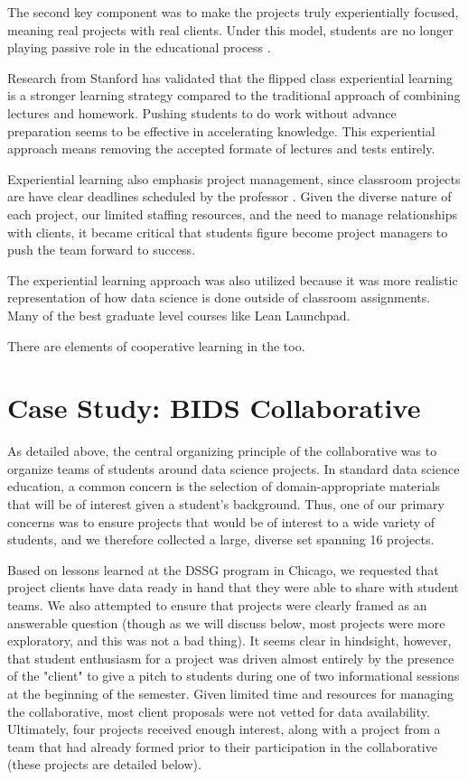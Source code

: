 \documentclass{sig-alternate}
\begin{document}
The second key component was to make the projects truly experientially focused, meaning real projects with real clients. Under this model, students are no longer playing passive role in the educational process \cite{beard2010experiential}.

Research from Stanford \cite{plotnikoff_classes_2013} has validated that the flipped class experiential learning is a stronger learning strategy compared to the traditional approach of combining lectures and homework. Pushing students to do work without advance preparation seems to be effective in accelerating knowledge. This experiential approach means removing the accepted formate of lectures and tests entirely. 

Experiential learning also emphasis project management, since classroom projects are have clear deadlines scheduled by the professor \cite{mok2014teaching}. Given the diverse nature of each project, our limited staffing resources, and the need to manage relationships with clients, it became critical that students figure become project managers to push the team forward to success.

The experiential learning approach was also utilized because it was more realistic representation of how data science is done outside of classroom assignments. Many of the best graduate level courses like Lean Launchpad. 

There are elements of cooperative learning in the too. 

\section{Case Study: BIDS Collaborative}

As detailed above, the central organizing principle of the collaborative was to organize teams of students around data science projects. In standard data science education, a common concern is the selection of domain-appropriate materials that will be of interest given a student's background. Thus, one of our primary concerns was to ensure projects that would be of interest to a wide variety of students, and we therefore collected a large, diverse set spanning 16 projects. 

Based on lessons learned at the DSSG program in Chicago, we requested that project clients have data ready in hand that they were able to share with student teams. We also attempted to ensure that projects were clearly framed as an answerable question (though as we will discuss below, most projects were more exploratory, and this was not a bad thing). It seems clear in hindsight, however, that student enthusiasm for a project was driven almost entirely by the presence of the "client" to give a pitch to students during one of two informational sessions at the beginning of the semester. Given limited time and resources for managing the collaborative, most client proposals were not vetted for data availability. Ultimately, four projects received enough interest, along with a project from a team that had already formed prior to their participation in the collaborative (these projects are detailed below).
\end{document}
